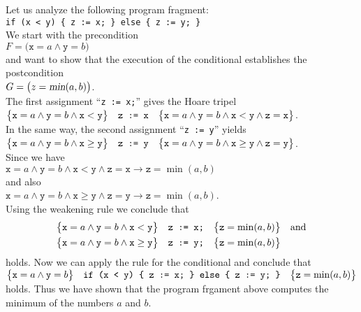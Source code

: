 \example
Let us analyze the following program fragment:
\\[0.2cm]
\hspace*{1.3cm}
\texttt{if (x < y) \{ z := x; \} else \{ z := y; \}}
\\[0.2cm]
We start with the precondition
\\[0.2cm]
\hspace*{1.3cm}
$F = \bigl(\texttt{x} = a \wedge \texttt{y} = b\bigr)$
\\[0.2cm]
and want to show that the execution of the conditional establishes the postcondition
\\[0.2cm]
\hspace*{1.3cm}
$G = \bigl(z = \textsl{min}(a, b)\bigr)$.
\\[0.2cm]
The first assignment ``\texttt{z := x;}'' gives the Hoare tripel 
\\[0.2cm]
\hspace*{1.3cm}
$\bigl\{\texttt{x} = a \wedge \texttt{y} = b \wedge \texttt{x} < \texttt{y}\bigr\}\quad\texttt{z := x}\quad\bigl\{
          \texttt{x} = a \wedge \texttt{y} = b \wedge \texttt{x} < \texttt{y} \wedge \texttt{z} = \texttt{x}\bigr\}
$.
\\[0.2cm]
In the same way, the second assignment ``\texttt{z := y}'' yields
\\[0.2cm]
\hspace*{1.3cm}
$\bigl\{\texttt{x} = a \wedge \texttt{y} = b \wedge \texttt{x} \geq \texttt{y}\bigr\}\quad\texttt{z := y}\quad\bigl\{
          \texttt{x} = a \wedge \texttt{y} = b \wedge \texttt{x} \geq \texttt{y} \wedge
          \texttt{z} = \texttt{y}\bigr\}$.
\\[0.2cm]
Since we have
\\[0.2cm]
\hspace*{1.3cm}
$\texttt{x} = a \wedge \texttt{y} = b \wedge \texttt{x} < \texttt{y} \wedge \texttt{z} = \texttt{x}
   \rightarrow \texttt{z} = \min(a,b)$
\\[0.2cm]
and also
\\[0.2cm]
\hspace*{1.3cm}
$ \texttt{x} = a \wedge \texttt{y} = b \wedge \texttt{x} \geq \texttt{y} \wedge \texttt{z} = \texttt{y} 
   \rightarrow \texttt{z} = \min(a,b)
$.
\\[0.2cm]
Using the weakening rule we conclude that 
\begin{eqnarray*}
\bigl\{\texttt{x} = a \wedge \texttt{y} = b \wedge \texttt{x} < \texttt{y}\bigr\}\quad\texttt{z := x;}\quad\bigl\{
       \texttt{z} = \min(a,b)\bigr\} & & \mathrm{and} \\
\bigl\{\texttt{x} = a \wedge \texttt{y} = b \wedge \texttt{x} \geq \texttt{y}\bigr\}\quad\texttt{z := y;}\quad\bigl\{
          \texttt{z} = \min(a,b)\bigr\}
\end{eqnarray*}
holds.  Now we can apply the rule for the conditional and conclude
that 
\\[0.2cm]
$ \bigl\{\texttt{x} = a \wedge \texttt{y} = b\bigr\}\quad\texttt{if (x < y) \{ z := x; \} else \{ z := y; \}}\quad\bigl\{ \texttt{z} = \min(a,b)\bigr\} $
\\[0.2cm]
holds.  Thus we have shown that the program frgament above computes
the minimum of the numbers $a$ and $b$.

